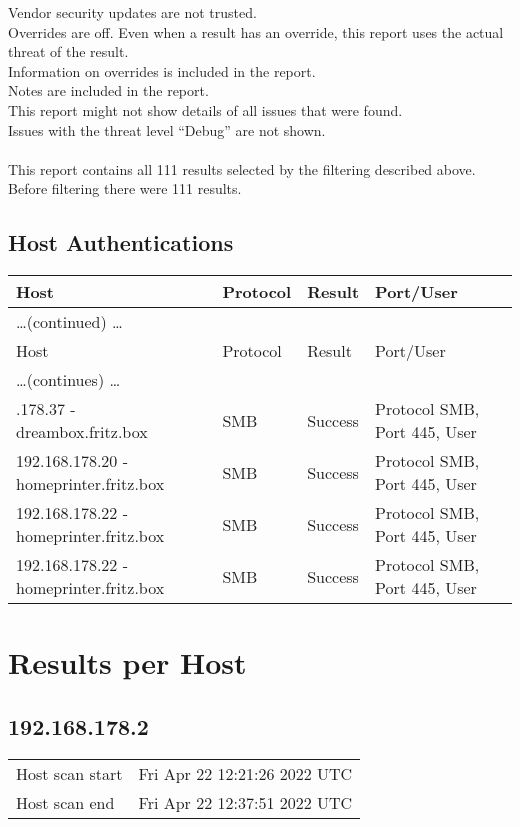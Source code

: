 \documentclass{article}
\begin{document}
Vendor security updates are not trusted.\\
Overrides are off.  Even when a result has an override, this report uses the actual threat of the result.\\
Information on overrides is included in the report.\\
Notes are included in the report.\\
This report might not show details of all issues that were found.\\
Issues with the threat level ``Debug'' are not shown.\\
\\
This report contains all 111 results selected by the filtering described above.  Before filtering there were 111 results.\subsection{Host Authentications}
\begin{longtable}{|l|l|l|l|}
\hline
\rowcolor{gvm_report}Host&Protocol&Result&Port/User\\
\hline
\endfirsthead
\multicolumn{4}{l}{\hfill\ldots (continued) \ldots}\\
\hline
\rowcolor{gvm_report}Host&Protocol&Result&Port/User\\
\hline
\endhead
\hline
\multicolumn{4}{l}{\ldots (continues) \ldots}\\
\endfoot
\hline
\endlastfoot
\hline
192.168.178.37 - dreambox.fritz.box & SMB & Success & Protocol SMB, Port 445, User \\ \hline192.168.178.20 - homeprinter.fritz.box & SMB & Success & Protocol SMB, Port 445, User \\ \hline192.168.178.22 - homeprinter.fritz.box & SMB & Success & Protocol SMB, Port 445, User \\ \hline192.168.178.22 - homeprinter.fritz.box & SMB & Success & Protocol SMB, Port 445, User \\ \hline\hline
\end{longtable}
\section{Results per Host}

\subsection{192.168.178.2}
\label{host:192.168.178.2}

\begin{tabular}{ll}
Host scan start&Fri Apr 22 12:21:26 2022 UTC\\
Host scan end&Fri Apr 22 12:37:51 2022 UTC\\
\end{tabular}
\end{document}
